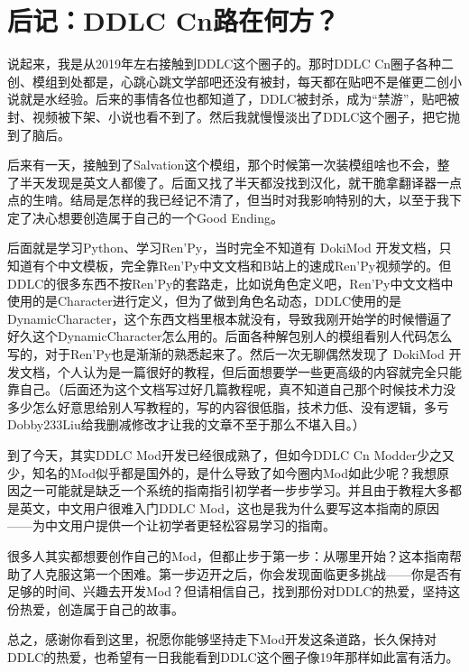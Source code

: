 \chapter*{后记：DDLC Cn路在何方？}

说起来，我是从2019年左右接触到DDLC这个圈子的。那时DDLC Cn圈子各种二创、模组到处都是，心跳心跳文学部吧还没有被封，每天都在贴吧不是催更二创小说就是水经验。后来的事情各位也都知道了，DDLC被封杀，成为“禁游”，贴吧被封、视频被下架、小说也看不到了。然后我就慢慢淡出了DDLC这个圈子，把它抛到了脑后。


后来有一天，接触到了Salvation这个模组，那个时候第一次装模组啥也不会，整了半天发现是英文人都傻了。后面又找了半天都没找到汉化，就干脆拿翻译器一点点的生啃。结局是怎样的我已经记不清了，但当时对我影响特别的大，以至于我下定了决心想要创造属于自己的一个Good Ending。


后面就是学习Python、学习Ren'Py，当时完全不知道有 DokiMod 开发文档，只知道有个中文模板，完全靠Ren'Py中文文档和B站上的速成Ren'Py视频学的。但DDLC的很多东西不按Ren'Py的套路走，比如说角色定义吧，Ren'Py中文文档中使用的是Character进行定义，但为了做到角色名动态，DDLC使用的是DynamicCharacter，这个东西文档里根本就没有，导致我刚开始学的时候懵逼了好久这个DynamicCharacter怎么用的。后面各种解包别人的模组看别人代码怎么写的，对于Ren'Py也是渐渐的熟悉起来了。然后一次无聊偶然发现了 DokiMod 开发文档，个人认为是一篇很好的教程，但后面想要学一些更高级的内容就完全只能靠自己。（后面还为这个文档写过好几篇教程呢，真不知道自己那个时候技术力没多少怎么好意思给别人写教程的，写的内容很低脂，技术力低、没有逻辑，多亏Dobby233Liu给我删减修改才让我的文章不至于那么不堪入目。）


到了今天，其实DDLC Mod开发已经很成熟了，但如今DDLC Cn Modder少之又少，知名的Mod似乎都是国外的，是什么导致了如今圈内Mod如此少呢？我想原因之一可能就是缺乏一个系统的指南指引初学者一步步学习。并且由于教程大多都是英文，中文用户很难入门DDLC Mod，这也是我为什么要写这本指南的原因——为中文用户提供一个让初学者更轻松容易学习的指南。

很多人其实都想要创作自己的Mod，但都止步于第一步：从哪里开始？这本指南帮助了人克服这第一个困难。第一步迈开之后，你会发现面临更多挑战——你是否有足够的时间、兴趣去开发Mod？但请相信自己，找到那份对DDLC的热爱，坚持这份热爱，创造属于自己的故事。

总之，感谢你看到这里，祝愿你能够坚持走下Mod开发这条道路，长久保持对DDLC的热爱，也希望有一日我能看到DDLC这个圈子像19年那样如此富有活力。
